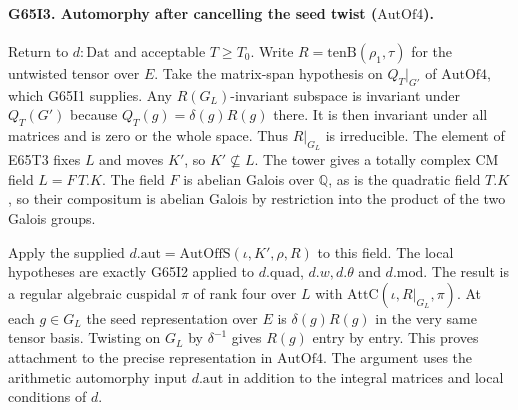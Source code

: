 \paragraph{G65I3. Automorphy after cancelling the seed twist ($\mathrm{AutOf4}$).}
Return to $d:\mathrm{Dat}$ and acceptable $T\ge T_0$. Write
$R=\mathrm{tenB}(\rho_1,\tau)$ for the untwisted tensor over $E$.
Take the matrix-span hypothesis on $Q_T|_{G'}$ of $\mathrm{AutOf4}$,
which G65I1 supplies. Any $R(G_L)$-invariant subspace is invariant
under $Q_T(G')$ because $Q_T(g)=\delta(g)R(g)$ there. It is then
invariant under all matrices and is zero or the whole space. Thus
$R|_{G_L}$ is irreducible. The element of E65T3 fixes $L$ and moves
$K'$, so $K'\not\subseteq L$. The tower gives a totally complex CM
field $L=F\,T.K$. The field $F$ is abelian Galois over $\mathbb Q$,
as is the quadratic field $T.K$, so their compositum is abelian
Galois by restriction into the product of the two Galois groups.

Apply the supplied $d.\mathrm{aut}=\mathrm{AutOffS}(\iota,K',\rho,R)$
to this field. The local hypotheses are exactly G65I2 applied to
$d.\mathrm{quad}$, $d.w,d.\theta$ and $d.\mathrm{mod}$.
The result is a regular algebraic cuspidal $\pi$ of rank four over
$L$ with $\mathrm{AttC}(\iota,R|_{G_L},\pi)$.
At each $g\in G_L$ the seed representation over $E$ is
$\delta(g)R(g)$ in the very same tensor basis. Twisting on $G_L$
by $\delta^{-1}$ gives $R(g)$ entry by entry. This proves attachment
to the precise representation in $\mathrm{AutOf4}$. The argument
uses the arithmetic automorphy input $d.\mathrm{aut}$ in addition
to the integral matrices and local conditions of $d$.
